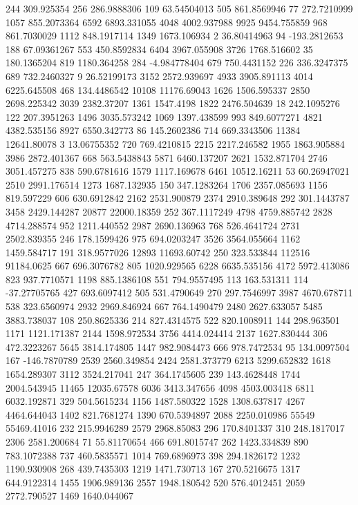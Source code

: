 244	309.925354
256	286.9888306
109	63.54504013
505	861.8569946
77	272.7210999
1057	855.2073364
6592	6893.331055
4048	4002.937988
9925	9454.755859
968	861.7030029
1112	848.1917114
1349	1673.106934
2	36.80414963
94	-193.2812653
188	67.09361267
553	450.8592834
6404	3967.055908
3726	1768.516602
35	180.1365204
819	1180.364258
284	-4.984778404
679	750.4431152
226	336.3247375
689	732.2460327
9	26.52199173
3152	2572.939697
4933	3905.891113
4014	6225.645508
468	134.4486542
10108	11176.69043
1626	1506.595337
2850	2698.225342
3039	2382.37207
1361	1547.4198
1822	2476.504639
18	242.1095276
122	207.3951263
1496	3035.573242
1069	1397.438599
993	849.6077271
4821	4382.535156
8927	6550.342773
86	145.2602386
714	669.3343506
11384	12641.80078
3	13.06755352
720	769.4210815
2215	2217.246582
1955	1863.905884
3986	2872.401367
668	563.5438843
5871	6460.137207
2621	1532.871704
2746	3051.457275
838	590.6781616
1579	1117.169678
6461	10512.16211
53	60.26947021
2510	2991.176514
1273	1687.132935
150	347.1283264
1706	2357.085693
1156	819.597229
606	630.6912842
2162	2531.900879
2374	2910.389648
292	301.1443787
3458	2429.144287
20877	22000.18359
252	367.1117249
4798	4759.885742
2828	4714.288574
952	1211.440552
2987	2690.136963
768	526.4641724
2731	2502.839355
246	178.1599426
975	694.0203247
3526	3564.055664
1162	1459.584717
191	318.9577026
12893	11693.60742
250	323.533844
112516	91184.0625
667	696.3076782
805	1020.929565
6228	6635.535156
4172	5972.413086
823	937.7710571
1198	885.1386108
551	794.9557495
113	163.531311
114	-37.27705765
427	693.6097412
505	531.4790649
270	297.7546997
3987	4670.678711
538	323.6560974
2932	2969.846924
667	764.1490479
2480	2627.633057
5485	3883.738037
108	250.8625336
214	827.4314575
522	820.1008911
144	298.963501
1171	1121.171387
2144	1598.972534
3756	4414.024414
2137	1627.830444
306	472.3223267
5645	3814.174805
1447	982.9084473
666	978.7472534
95	134.0097504
167	-146.7870789
2539	2560.349854
2424	2581.373779
6213	5299.652832
1618	1654.289307
3112	3524.217041
247	364.1745605
239	143.4628448
1744	2004.543945
11465	12035.67578
6036	3413.347656
4098	4503.003418
6811	6032.192871
329	504.5615234
1156	1487.580322
1528	1308.637817
4267	4464.644043
1402	821.7681274
1390	670.5394897
2088	2250.010986
55549	55469.41016
232	215.9946289
2579	2968.85083
296	170.8401337
310	248.1817017
2306	2581.200684
71	55.81170654
466	691.8015747
262	1423.334839
890	783.1072388
737	460.5835571
1014	769.6896973
398	294.1826172
1232	1190.930908
268	439.7435303
1219	1471.730713
167	270.5216675
1317	644.9122314
1455	1906.989136
2557	1948.180542
520	576.4012451
2059	2772.790527
1469	1640.044067
